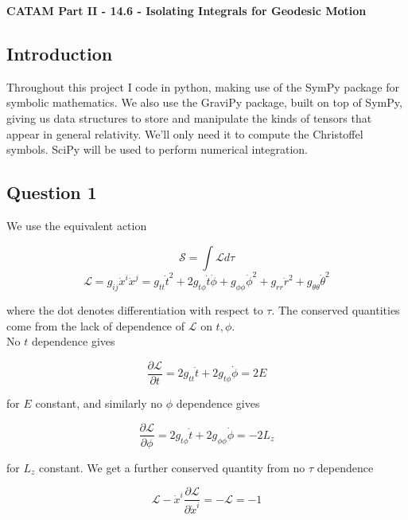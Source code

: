 \documentclass[10pt,a4paper]{report}
\begin{document}
\textbf{CATAM Part II - 14.6 - Isolating Integrals for Geodesic Motion}
\thispagestyle{empty}

\newpage

\subsection*{Introduction}

Throughout this project I code in python, making use of the SymPy package for symbolic mathematics. We also use the GraviPy package, built on top of SymPy, giving us data structures to store and manipulate the kinds of tensors that appear in general relativity. We'll only need it to compute the Christoffel symbols. SciPy will be used to perform numerical integration. 
\subsection*{Question 1}

We use the equivalent action 

\begin{equation*}
\mathcal{S}=\int \mathcal{L} d\tau
\end{equation*}
\begin{equation*}
\mathcal{L}=g_{ij}\dot{x}^i\dot{x}^j = g_{tt}\dot{t}^2 + 2g_{t\phi}\dot{t}\dot{\phi}+g_{\phi\phi}\dot{\phi}^2+g_{rr}\dot{r}^2+g_{\theta\theta}\dot{\theta}^2
\end{equation*} 

where the dot denotes differentiation with respect to $\tau$. The conserved quantities come from the lack of dependence of $\mathcal{L}$ on $t, \phi$.\\

No $t$ dependence gives

\begin{equation}
\frac{\partial \mathcal{L}}{\partial t} = 2g_{tt}\dot{t} + 2g_{t\phi}\dot{\phi} = 2E
\label{Edef}
\end{equation}

for $E$ constant, and similarly no $\phi$ dependence gives 

\begin{equation}
\frac{\partial \mathcal{L}}{\partial \phi} = 2g_{t\phi}\dot{t}+2g_{\phi\phi}\dot{\phi} = -2L_z
\label{Ldef}
\end{equation}

for $L_z$ constant. We get a further conserved quantity from no $\tau$ dependence

\begin{equation}
\mathcal{L} - \dot{x}^i \frac{\partial \mathcal{L}}{\partial \dot{x}^i} = -\mathcal{L} = -1
\label{Qdef}
\end{equation}
\end{document}
